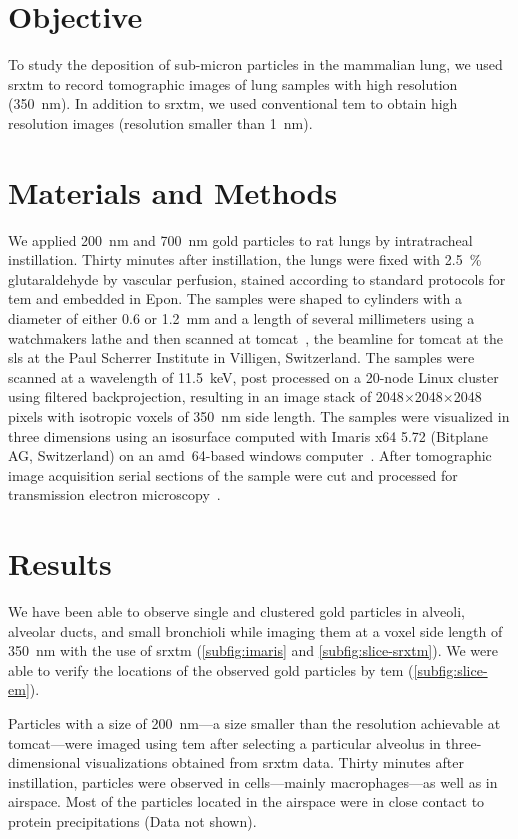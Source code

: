 \section{Objective}
To study the deposition of sub-micron particles in the mammalian lung, we used \ac{srxtm} to record tomographic images of lung samples with high resolution (\SI{350}{\nano\meter}). In addition to \ac{srxtm}, we used conventional \ac{tem} to obtain high resolution images (resolution smaller than \SI{1}{\nano\meter}).

\section{Materials and Methods}
We applied \SI{200}{\nano\meter} and \SI{700}{\nano\meter} gold particles to rat lungs by intratracheal instillation. Thirty minutes after instillation, the lungs were fixed with \SI{2.5}{\%} glutaraldehyde by vascular perfusion, stained according to standard protocols for \ac{tem} and embedded in Epon. The samples were shaped to cylinders with a diameter of either 0.6 or \SI{1.2}{\milli\meter} and a length of several millimeters using a watchmakers lathe and then scanned at \ac{tomcat}~\cite{Stampanoni2007}, the beamline for \acl{tomcat} at the \acl{sls} at the Paul Scherrer Institute in Villigen, Switzerland. The samples were scanned at a wavelength of \SI{11.5}{\kilo\electronvolt}, post processed on a 20-node Linux cluster using filtered backprojection, resulting in an image stack of 2048$\times$2048$\times$2048 pixels with isotropic voxels of \SI{350}{\nano\meter} side length. The samples were visualized in three dimensions using an isosurface computed with Imaris x64 5.72 (Bitplane AG, Switzerland) on an \ac{amd}~64-based windows computer~\cite{Tsuda2008}. After tomographic image acquisition serial sections of the sample were cut and processed for transmission electron microscopy~\cite{Mund2008}. 

\section{Results}
We have been able to observe single and clustered gold particles in alveoli, alveolar ducts, and small bronchioli while imaging them at a voxel side length of \SI{350}{\nano\meter} with the use of \ac{srxtm} (\autoref{subfig:imaris} and \ref{subfig:slice-srxtm}). We were able to verify the locations of the observed gold particles by \ac{tem} (\autoref{subfig:slice-em}). 

Particles with a size of \SI{200}{\nano\meter}---a size smaller than the resolution achievable at \ac{tomcat}---were imaged using \ac{tem} after selecting a particular alveolus in three-dimensional visualizations obtained from \ac{srxtm} data. Thirty minutes after instillation, particles were observed in cells---mainly macrophages---as well as in airspace. Most of the particles located in the airspace were in close contact to protein precipitations (Data not shown).

